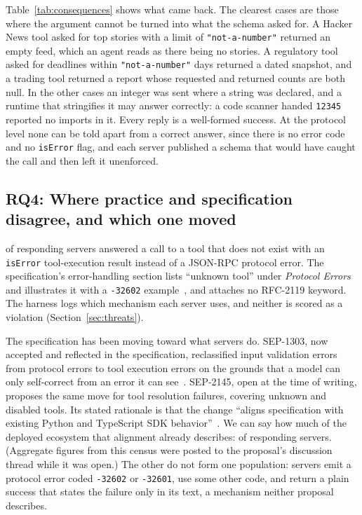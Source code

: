Table~\ref{tab:consequences} shows what came back. The clearest cases are those
where the argument cannot be turned into what the schema asked for. A Hacker News tool
asked for top stories with a limit of \texttt{"not-a-number"} returned an empty feed,
which an agent reads as there being no stories. A regulatory tool asked for deadlines
within \texttt{"not-a-number"} days returned a dated snapshot, and a trading tool
returned a report whose requested and returned counts are both null. In the other
cases an integer was sent where a string was declared, and a runtime that stringifies
it may answer correctly: a code scanner handed \texttt{12345} reported no imports in
it. Every reply is a well-formed success. At the protocol level none can be told apart
from a correct answer, since there is no error code and no \texttt{isError} flag, and
each server published a schema that would have caught the call and then left it
unenforced.



\subsection{RQ4: Where practice and specification disagree, and which one moved}
\ErrAsResultRateCl{} of responding servers answered a call to a tool that does not exist
with an \texttt{isError} tool-execution result instead of a JSON-RPC protocol error. The
specification's error-handling section lists ``unknown tool'' under \emph{Protocol
Errors} and illustrates it with a \texttt{-32602} example~\cite{mcpspec}, and attaches
no RFC-2119 keyword. The harness logs which mechanism each server uses, and neither
is scored as a violation (Section~\ref{sec:threats}).

The specification has been moving toward what servers do. SEP-1303, now
accepted and reflected in the specification, reclassified input validation errors from
protocol errors to tool execution errors on the grounds that a model can only
self-correct from an error it can see~\cite{sep1303}. SEP-2145, open at the time of
writing, proposes the same move for tool resolution failures, covering unknown and
disabled tools. Its stated rationale is that the change ``aligns specification with existing
Python and TypeScript SDK behavior''~\cite{sep2145}. We can say how much of
the deployed ecosystem that alignment already describes: \ErrAsResultRateCl{} of
responding servers. (Aggregate figures from this census were posted to the
proposal's discussion thread while it was open.) The other \NotErrAsResultPct{} do
not form one population: \UnknownProtoErrCount{} servers emit a protocol error coded
\texttt{-32602} or \texttt{-32601}, \UnknownWrongCodeCount{} use some other code, and
\UnknownProseCount{} return a plain success that states the failure only in its text,
a mechanism neither proposal describes.

